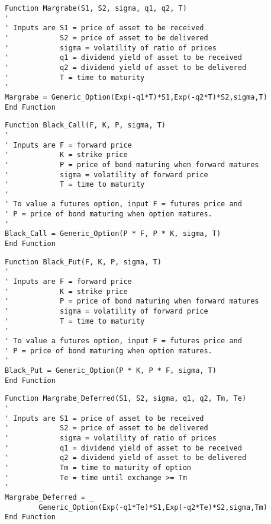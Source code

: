 \small\begin{verbatim}
Function Margrabe(S1, S2, sigma, q1, q2, T)
'
' Inputs are S1 = price of asset to be received
'            S2 = price of asset to be delivered
'            sigma = volatility of ratio of prices
'            q1 = dividend yield of asset to be received
'            q2 = dividend yield of asset to be delivered
'            T = time to maturity
'
Margrabe = Generic_Option(Exp(-q1*T)*S1,Exp(-q2*T)*S2,sigma,T)
End Function
\end{verbatim}\normalsize

\small\begin{verbatim}
Function Black_Call(F, K, P, sigma, T)
'
' Inputs are F = forward price
'            K = strike price
'            P = price of bond maturing when forward matures
'            sigma = volatility of forward price
'            T = time to maturity
'
' To value a futures option, input F = futures price and 
' P = price of bond maturing when option matures.
'
Black_Call = Generic_Option(P * F, P * K, sigma, T)
End Function
\end{verbatim}\normalsize

\small\begin{verbatim}
Function Black_Put(F, K, P, sigma, T)
'
' Inputs are F = forward price
'            K = strike price
'            P = price of bond maturing when forward matures
'            sigma = volatility of forward price
'            T = time to maturity
'
' To value a futures option, input F = futures price and 
' P = price of bond maturing when option matures.
'
Black_Put = Generic_Option(P * K, P * F, sigma, T)
End Function
\end{verbatim}\normalsize

\small\begin{verbatim}
Function Margrabe_Deferred(S1, S2, sigma, q1, q2, Tm, Te)
'
' Inputs are S1 = price of asset to be received
'            S2 = price of asset to be delivered
'            sigma = volatility of ratio of prices
'            q1 = dividend yield of asset to be received
'            q2 = dividend yield of asset to be delivered
'            Tm = time to maturity of option
'            Te = time until exchange >= Tm
'
Margrabe_Deferred = _
        Generic_Option(Exp(-q1*Te)*S1,Exp(-q2*Te)*S2,sigma,Tm)
End Function
\end{verbatim}\normalsize


